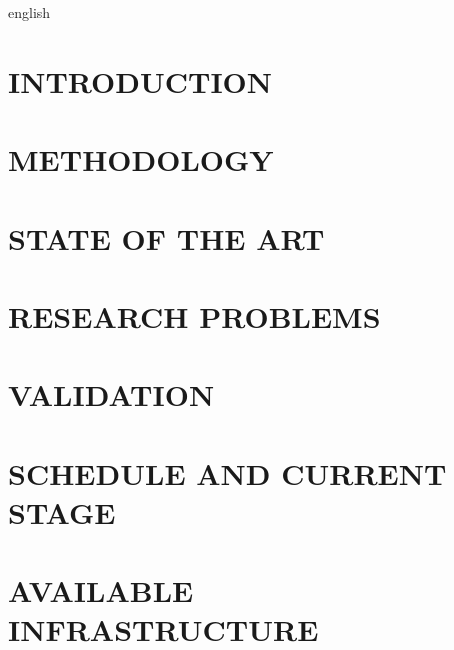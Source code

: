 \documentclass[
	12pt,				         				%
	openany,			     				%
	chapter=TITLE,   				%
	sumario=abnt-6027-2012, %
	oneside,			        				%
	a4paper,			    				%
	brazil,		         					%
	english			        				%
	]{abntex2}
\begin{document}
\frenchspacing 

\imprimircapa

% 

\begin{resumo}[Summary]
 \begin{otherlanguage*}{english}

 \end{otherlanguage*}
\end{resumo}

\tableofcontents*
\cleardoublepage

\textual

\chapter{INTRODUCTION}

%
% 
\chapter{METHODOLOGY}


\chapter{STATE OF THE ART}


\chapter{RESEARCH PROBLEMS}


\chapter{VALIDATION}


\chapter{SCHEDULE AND CURRENT STAGE}


\chapter{AVAILABLE INFRASTRUCTURE}


% 
%
% 
%
%

\end{document}
